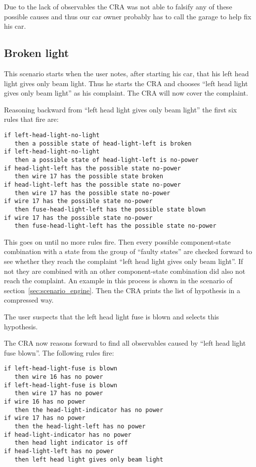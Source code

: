 Due to the lack of observables the CRA was not able to falsify any of these possible causes and thus our car owner probably has to call the garage to help fix his car.

\subsection{Broken light}
This scenario starts when the user notes, after starting his car, that his left head light gives only beam light. Thus he starts the CRA and chooses ``left head light gives only beam light'' as his complaint. The CRA will now cover the complaint.

Reasoning backward from ``left head light gives only beam light'' the first six rules that fire are:
\begin{verbatim}
if left-head-light-no-light 
   then a possible state of head-light-left is broken
if left-head-light-no-light 
   then a possible state of head-light-left is no-power
if head-light-left has the possible state no-power 
   then wire 17 has the possible state broken
if head-light-left has the possible state no-power 
   then wire 17 has the possible state no-power
if wire 17 has the possible state no-power 
   then fuse-head-light-left has the possible state blown
if wire 17 has the possible state no-power 
   then fuse-head-light-left has the possible state no-power
\end{verbatim}

This goes on until no more rules fire. Then every possible component-state combination with a state from the group of ``faulty states'' are checked forward to see whether they reach the complaint ``left head light gives only beam light''. If not they are combined with an other component-state combination did also not reach the complaint. An example in this process is shown in the scenario of section~\ref{sec:scenario_engine}. Then the CRA prints the list of hypothesis in a compressed way.

The user suspects that the left head light fuse is blown and selects this hypothesis.

The CRA now reasons forward to find all observables caused by ``left head light fuse blown''. The following rules fire:
\begin{verbatim}
if left-head-light-fuse is blown 
   then wire 16 has no power
if left-head-light-fuse is blown 
   then wire 17 has no power
if wire 16 has no power 
   then the head-light-indicator has no power
if wire 17 has no power 
   then the head-light-left has no power
if head-light-indicator has no power 
   then head light indicator is off
if head-light-left has no power 
   then left head light gives only beam light
\end{verbatim}

